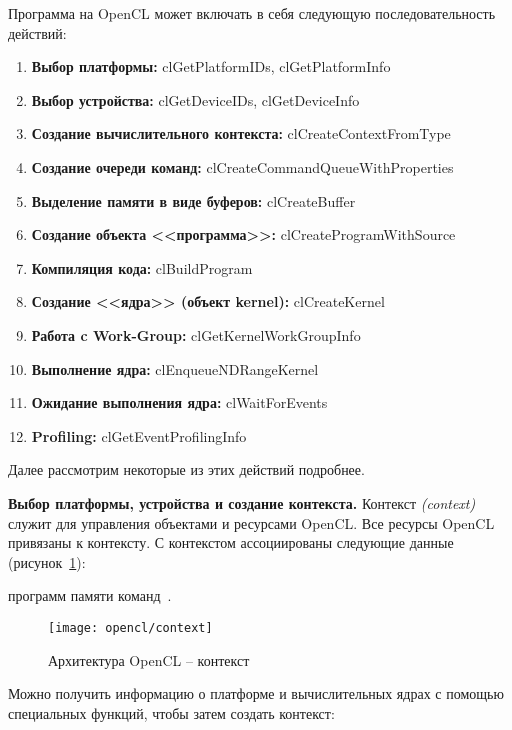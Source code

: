 Программа на OpenCL может включать в себя следующую последовательность действий:
    \begin{enumerate}
        \item\textbf{Выбор платформы:} clGetPlatformIDs, clGetPlatformInfo
        \item\textbf{Выбор устройства:} clGetDeviceIDs, clGetDeviceInfo
        \item\textbf{Создание вычислительного контекста:} cl\-Create\-Context\-From\-Type
        \item\textbf{Создание очереди команд:} cl\-Create\-Command\-Queue\-With\-Pro\-per\-ties
        \item\textbf{Выделение памяти в виде буферов:} clCreateBuffer
        \item\textbf{Создание объекта <<программа>>:} clCreateProgramWithSource
        \item\textbf{Компиляция кода:} clBuildProgram
        \item\textbf{Создание <<ядра>> (объект kernel):} clCreateKernel
        \item\textbf{Работа c Work-Group:} clGetKernelWorkGroupInfo 
        \item\textbf{Выполнение ядра:} clEnqueueNDRangeKernel 
        \item\textbf{Ожидание выполнения ядра:} clWaitForEvents 
        \item\textbf{Profiling:} clGetEventProfilingInfo
    \end{enumerate}

Далее рассмотрим некоторые из этих действий подробнее.

\textbf{Выбор платформы, устройства и создание контекста.} Контекст \textit{(context)} служит для управления объектами и ресурсами OpenCL. Все ресурсы OpenCL привязаны к контексту. С контекстом ассоциированы следующие данные (рисунок~\ref{OpenCLContext:image}):

\begin{itemize}
     программ
     памяти
     команд~\cite{Bastrakov2011}.
\end{itemize}

\begin{figure}[H]
    \texttt{[image: opencl/context]}
    \caption{Архитектура OpenCL -- контекст}
    \label{OpenCLContext:image}
\end{figure}

Можно получить информацию о платформе и вычислительных ядрах с помощью специальных функций, чтобы затем создать контекст:

